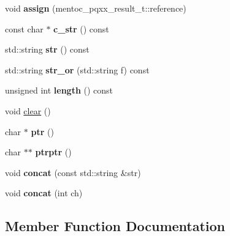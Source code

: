 \begin{DoxyCompactItemize}
\item 
\mbox{\label{structmods_1_1string_a073a15ecaae332359323f8a41db017c2}} 
void {\bfseries assign} (mentoc\+\_\+pqxx\+\_\+result\+\_\+t\+::reference)
\item 
\mbox{\label{structmods_1_1string_a28ba8da0cd049168b63849d776da700d}} 
const char $\ast$ {\bfseries c\+\_\+str} () const
\item 
\mbox{\label{structmods_1_1string_a1d3aded5a718bb53682400167f8b399f}} 
std\+::string {\bfseries str} () const
\item 
\mbox{\label{structmods_1_1string_ac3c41d9682746119c8c2fb2b0aae23ed}} 
std\+::string {\bfseries str\+\_\+or} (std\+::string f) const
\item 
\mbox{\label{structmods_1_1string_abf7ae8e1b8a36a0d5f10245f23ea31a2}} 
unsigned int {\bfseries length} () const
\item 
void \hyperlink{structmods_1_1string_af8bc8473eee2fccba17c36e1987d5798}{clear} ()
\item 
\mbox{\label{structmods_1_1string_ac0e687665dac7196a51bd26016f6ab72}} 
char $\ast$ {\bfseries ptr} ()
\item 
\mbox{\label{structmods_1_1string_ae7f4103313cf78b296414a4dcf2634d1}} 
char $\ast$$\ast$ {\bfseries ptrptr} ()
\item 
\mbox{\label{structmods_1_1string_ada07a7233d0c137c3574ecb2f6c5ee3c}} 
void {\bfseries concat} (const std\+::string \&str)
\item 
\mbox{\label{structmods_1_1string_aa36191acf4ca2eb455558a804d4a3a41}} 
void {\bfseries concat} (int ch)
\end{DoxyCompactItemize}


\subsection{Member Function Documentation}
\mbox{\label{structmods_1_1string_af8bc8473eee2fccba17c36e1987d5798}} 
